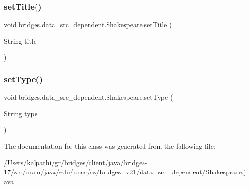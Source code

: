\mbox{\label{classbridges_1_1data__src__dependent_1_1_shakespeare_a2687017aca35bb26b148f784a0bff732}} 
\subsubsection{\texorpdfstring{set\+Title()}{setTitle()}}
{\footnotesize\ttfamily void bridges.\+data\+\_\+src\+\_\+dependent.\+Shakespeare.\+set\+Title (\begin{DoxyParamCaption}\item[{String}]{title }\end{DoxyParamCaption})}

\mbox{\label{classbridges_1_1data__src__dependent_1_1_shakespeare_afcee18014d5630a0a15701635005bea2}} 
\subsubsection{\texorpdfstring{set\+Type()}{setType()}}
{\footnotesize\ttfamily void bridges.\+data\+\_\+src\+\_\+dependent.\+Shakespeare.\+set\+Type (\begin{DoxyParamCaption}\item[{String}]{type }\end{DoxyParamCaption})}



The documentation for this class was generated from the following file\+:\begin{DoxyCompactItemize}
\item 
/\+Users/kalpathi/gr/bridges/client/java/bridges-\/17/src/main/java/edu/uncc/cs/bridges\+\_\+v21/data\+\_\+src\+\_\+dependent/\mbox{\hyperlink{_shakespeare_8java}{Shakespeare.\+java}}\end{DoxyCompactItemize}
